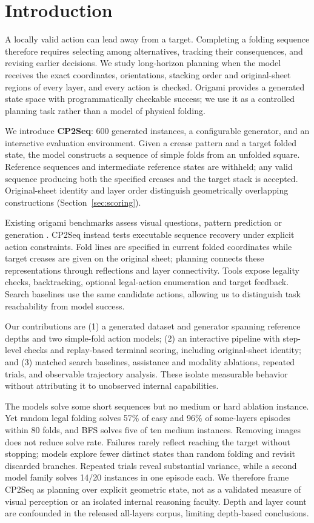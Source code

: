 \section{Introduction}
\label{sec:intro}
A locally valid action can lead away from a target. Completing a folding sequence therefore
requires selecting among alternatives, tracking their consequences, and revising earlier
decisions. We study long-horizon planning when the model receives the exact coordinates,
orientations, stacking order and original-sheet regions of every layer, and every action is
checked. Origami provides a generated state space with programmatically checkable success;
we use it as a controlled planning task rather than a model of physical folding.

We introduce \textbf{CP2Seq}: 600 generated instances, a configurable generator, and an
interactive evaluation environment. Given a crease pattern and a target folded state, the
model constructs a sequence of simple folds from an unfolded square. Reference sequences
and intermediate reference states are withheld; any valid sequence producing both the
specified creases and the target stack is accepted. Original-sheet identity and layer order
distinguish geometrically overlapping constructions (Section~\ref{sec:scoring}).

Existing origami benchmarks assess visual questions, pattern prediction or generation
\citep{gamibench,origamispace,origamibench}. CP2Seq instead tests executable sequence
recovery under explicit action constraints. Fold lines are specified in current folded
coordinates while target creases are given on the original sheet; planning connects these
representations through reflections and layer connectivity. Tools expose legality checks,
backtracking, optional legal-action enumeration and target feedback. Search baselines use
the same candidate actions, allowing us to distinguish task reachability from model success.

Our contributions are (1) a generated dataset and generator spanning reference depths and
two simple-fold action models; (2) an interactive pipeline with step-level checks and
replay-based terminal scoring, including original-sheet identity; and (3) matched search
baselines, assistance and modality ablations, repeated trials, and observable trajectory
analysis. These isolate measurable behavior without attributing it to unobserved internal
capabilities.

The models solve some short sequences but no medium or hard ablation instance. Yet random
legal folding solves 57\% of easy and 96\% of some-layers episodes within 80 folds, and BFS
solves five of ten medium instances. Removing images does not reduce solve rate. Failures
rarely reflect reaching the target without stopping; models explore fewer distinct states
than random folding and revisit discarded branches. Repeated trials reveal substantial
variance, while a second model family solves 14/20 instances in one episode each. We
therefore frame CP2Seq as planning over explicit geometric state, not as a validated measure
of visual perception or an isolated internal reasoning faculty. Depth and layer count are
confounded in the released all-layers corpus, limiting depth-based conclusions.
